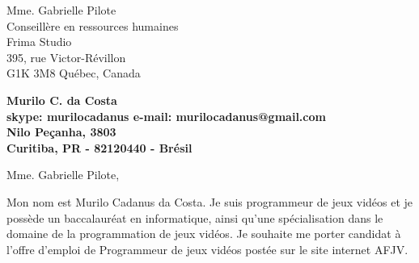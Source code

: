 \documentclass[11pt]{letter} %
\begin{document}

\begin{letter}{Mme. Gabrielle Pilote \\
Conseillère en ressources humaines \\
Frima Studio \\
395, rue Victor-Révillon \\
G1K 3M8 Québec, Canada} 


\begin{center}
\large\bf Murilo C. da Costa \\ %
skype: murilocadanus e-mail: murilocadanus@gmail.com \\
Nilo Peçanha, 3803 \\ Curitiba, PR - 82120440 - Brésil
\end{center} 
\vfill

\signature{Murilo C. da Costa} %


\opening{Mme. Gabrielle Pilote,} 


Mon nom est Murilo Cadanus da Costa. Je suis programmeur de jeux vidéos et je possède un baccalauréat en informatique, ainsi qu'une spécialisation dans le domaine de la programmation de jeux vidéos. Je souhaite me porter candidat à l'offre d'emploi de Programmeur de jeux vidéos postée sur le site internet AFJV.


\end{letter}
\end{document}
